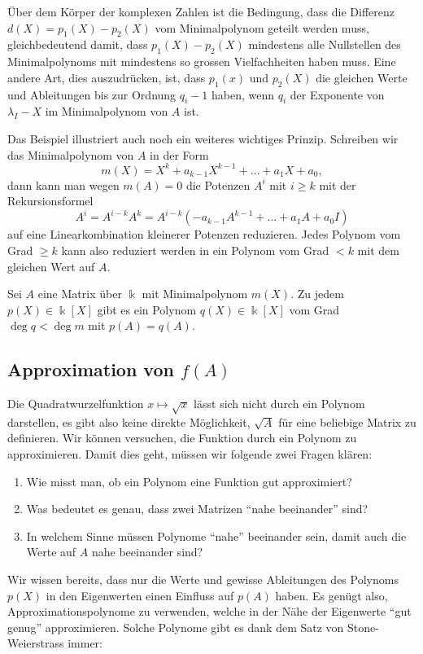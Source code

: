 Über dem Körper der komplexen Zahlen ist die Bedingung, dass die Differenz
$d(X)=p_1(X)-p_2(X)$ vom Minimalpolynom geteilt werden muss, gleichbedeutend
damit, dass $p_1(X)-p_2(X)$ mindestens alle Nullstellen des Minimalpolynoms
mit mindestens so grossen Vielfachheiten haben muss.
Eine andere Art, dies auszudrücken, ist, dass $p_1(x)$ und $p_2(X)$
die gleichen Werte und Ableitungen bis zur Ordnung $q_i-1$ haben, wenn
$q_i$ der Exponente von $\lambda_I-X$ im Minimalpolynom von $A$ ist.

Das Beispiel illustriert auch noch ein weiteres wichtiges Prinzip.
Schreiben wir das Minimalpolynom von $A$ in der Form
\[
m(X)
=
X^k + a_{k-1}X^{k-1} + \dots + a_1X + a_0,
\]
dann kann man wegen $m(A)=0$ die Potenzen $A^i$ mit $i\ge k$ mit der
Rekursionsformel
\[
A^i
=
A^{i-k}A^k
=
A^{i-k}(-a_{k-1}A^{k-1}+ \dots + a_1 A + a_0I)
\]
auf eine Linearkombination kleinerer Potenzen reduzieren.
Jedes Polynom vom Grad $\ge k$ kann also reduziert werden in
ein Polynom vom Grad $<k$ mit dem gleichen Wert auf $A$.

\begin{satz}
\label{buch:eigenwerte:satz:reduktion}
Sei $A$ eine Matrix über $\Bbbk$ mit Minimalpolynom $m(X)$.
Zu jedem $p(X)\in\Bbbk[X]$ gibt es ein Polynom $q(X)\in\Bbbk[X]$
vom Grad $\deg q<\deg m$ mit $p(A)=q(A)$.
\end{satz}

%
%
\subsection{Approximation von $f(A)$
\label{buch:subsection:approximation}}
Die Quadratwurzelfunktion $x\mapsto\sqrt{x}$ lässt sich nicht durch ein
%
Polynom darstellen, es gibt also keine direkte Möglichkeit, $\sqrt{A}$
für eine beliebige Matrix zu definieren.
Wir können versuchen, die Funktion durch ein Polynom zu approximieren.
Damit dies geht, müssen wir folgende zwei Fragen klären:
\begin{enumerate}
\item
Wie misst man, ob ein Polynom eine Funktion gut approximiert?
\item
Was bedeutet es genau, dass zwei Matrizen ``nahe beeinander'' sind?
\item
In welchem Sinne müssen Polynome ``nahe'' beeinander sein, damit
auch die Werte auf $A$ nahe beeinander sind?
\end{enumerate}

Wir wissen bereits, dass nur die Werte und gewisse Ableitungen des
Polynoms $p(X)$ in den Eigenwerten einen Einfluss auf $p(A)$ haben.
Es genügt also, Approximationspolynome zu verwenden, welche in der Nähe
der Eigenwerte ``gut genug'' approximieren.
Solche Polynome gibt es dank dem Satz von Stone-Weierstrass immer:

